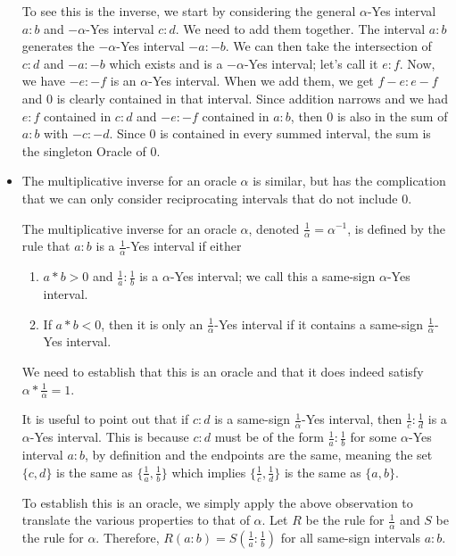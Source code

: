 \documentclass[12pt]{article}
\theoremstyle{remark}
\begin{document}
\begin{itemize}
    To see this is the inverse, we start by considering the general $\alpha$-Yes interval $a:b$ and $-\alpha$-Yes interval $c:d$. We need to add them together. The interval $a:b$ generates the $-\alpha$-Yes interval $-a:-b$. We can then take the intersection of $c:d$ and $-a:-b$ which exists and is a $-\alpha$-Yes interval; let's call it $e:f$. Now, we have $-e:-f$ is an $\alpha$-Yes interval. When we add them, we get $f-e:e-f$ and $0$ is clearly contained in that interval. Since addition narrows and we had $e:f$ contained in $c:d$ and $-e:-f$ contained in $a:b$, then $0$ is also in the sum of $a:b$ with $-c:-d$. Since $0$ is contained in every summed interval, the sum is the singleton Oracle of $0$. 
    
    \item The multiplicative inverse for an oracle $\alpha$ is similar, but has the complication that we can only consider reciprocating intervals that do not include 0. 
    
    The multiplicative inverse for an oracle $\alpha$, denoted $\frac{1}{\alpha} = \alpha^{-1}$, is defined by the rule that $a:b$ is a $\frac{1}{\alpha}$-Yes interval if either 
    
    \begin{enumerate}
        \item  $a*b > 0$  and $\frac{1}{a}:\frac{1}{b}$ is a $\alpha$-Yes interval; we call this a same-sign $\alpha$-Yes interval.
        \item If $a*b<0$, then it is only an $\frac{1}{\alpha}$-Yes interval if it contains a same-sign $\frac{1}{\alpha}$-Yes interval. 
    \end{enumerate}
    
    We need to establish that this is an oracle and that it does indeed satisfy $\alpha * \frac{1}{\alpha} = 1$.
    
    It is useful to point out that if $c:d$ is a same-sign $\frac{1}{\alpha}$-Yes interval, then $\frac{1}{c}:\frac{1}{d}$ is a $\alpha$-Yes interval. This is because $c:d$ must be of the form $\frac{1}{a}:\frac{1}{b}$ for some $\alpha$-Yes interval $a:b$, by definition and the endpoints are the same, meaning the set $\{c,d\}$ is the same as $\{\frac{1}{a}, \frac{1}{b}\}$ which implies $\{\frac{1}{c}, \frac{1}{d}\}$ is the same as $\{a, b\}$.
    
    To establish this is an oracle, we simply apply the above observation to translate the various properties to that of $\alpha$. Let $R$ be the rule for $\frac{1}{\alpha}$ and $S$ be the rule for $\alpha$. Therefore, $R(a:b)=S(\frac{1}{a}:\frac{1}{b})$ for all same-sign intervals $a:b$.
    

\end{itemize}
\end{document}
